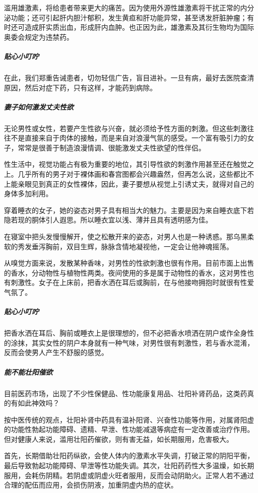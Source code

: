 滥用雄激素，将给患者带来更大的痛苦。因为使用外源性雄激素将干扰正常的内分泌功能；还可引起肝内胆汁郁积，发生黄疸和肝功能异常，甚至诱发肝脏肿瘤；有时还可造成肝实质出血，形成肝内血肿。也正因为此，雄激素及其衍生物均为国际奥委会规定为违禁药。

\subparagraph{贴心小叮咛}

在此，我们郑重告诫患者，切勿轻信广告，盲目进补。一旦有病，最好去医院查清原因，然后对症下药，只有这样，才能药到病除。

\subparagraph{妻子如何激发丈夫性欲}

无论男性或女性，若要产生性欲与兴奋，就必须给予性方面的刺激。但这些刺激往往不是直接来自于肉体的接触，而是来自对浪漫气氛的感受。一个富有吸引力的女子，常常是很善于制造浪漫情调、很能激发丈夫性欲望的性伴侣。

性生活中，视觉功能占有极为重要的地位，其引导性欲的刺激作用甚至还在触觉之上。几乎所有的男子对于裸体画和春宫图都会兴趣盎然，但再怎么说，这些都比不上能亲眼见到真正的女性裸体，因此，妻子要想从视觉上引诱丈夫，就得对自己的身体多加利用。

穿着睡衣的女子，她的姿态对男子具有相当大的魅力。主要是因为来自睡衣底下若隐若现的胴体引人遐思。所以睡衣宜以浅、薄并且具有透明感为佳。

在寝室中把头发慢慢解开，使之松散开来的姿态，对男人也是一种诱惑。那乌黑柔软的秀发垂泻胸前，双目生辉，脉脉含情地凝视他，一定会让他神魂摇荡。

从嗅觉方面来说，发散某种香味，对男性的性欲刺激也很有作用。目前市面上出售的香水，分动物性与植物性两类。夜间使用的多是属于动物性的香水，这对男性也有刺激性。女子在上床前，把香水洒在耳后或胸前，在与他接吻拥抱时就很有性爱气氛了。

\subparagraph{贴心小叮咛}

把香水洒在耳后、胸前或睡衣上是很理想的，但不必把香水喷洒在阴户或作全身性的涂抹，其实女性的阴户本身就有一种气味，对男性很有刺激性，若与香水混淆，反而会使男人产生不舒服的感觉。

\subparagraph{能不能壮阳催欲}

目前医药市场，出现了不少性保健品、性功能康复用品、壮阳补肾药品，这类药真的有如此神效吗？

按中医传统的观点，壮阳补肾中药具有温补阳肾、兴奋性功能等作用，对属肾阳虚的功能性勃起功能障碍、遗精、早泄、性功能减退等病症有一定改善或治疗作用。但对健康人来说，滥用壮阳药催欲，则有害无益，如长期服用，危害极大。

首先，长期借助壮阳药纵欲，会使人体内的激素水平失调，打破正常的阴阳平衡，最后导致勃起功能障碍、早泄等性功能失调。其次，壮阳药药性大多温燥，如长期服用，会耗伤阴精。若阴虚或阴虚火旺者服用，反而会动阴助火。正常人若不通过合理的配伍而应用，会损伤阴液，加重阴虚内热的症状。

